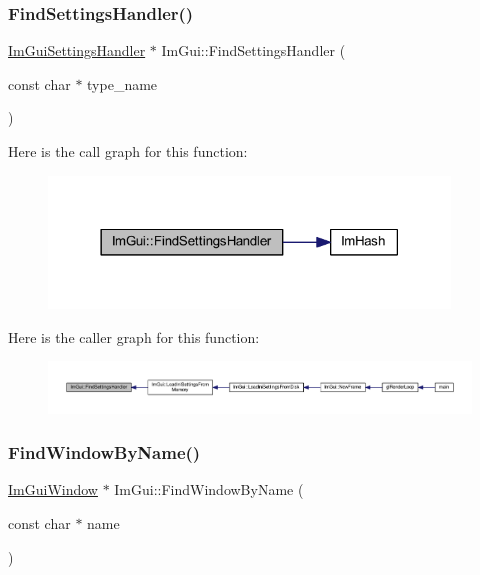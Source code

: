 \subsubsection{\texorpdfstring{Find\+Settings\+Handler()}{FindSettingsHandler()}}
{\footnotesize\ttfamily \mbox{\hyperlink{struct_im_gui_settings_handler}{Im\+Gui\+Settings\+Handler}} $\ast$ Im\+Gui\+::\+Find\+Settings\+Handler (\begin{DoxyParamCaption}\item[{const char $\ast$}]{type\+\_\+name }\end{DoxyParamCaption})}

Here is the call graph for this function\+:
\nopagebreak
\begin{figure}[H]
\begin{center}
\leavevmode
\includegraphics[width=302pt]{namespace_im_gui_ad9e15440c52f63aa96ef3b3938d566f8_cgraph}
\end{center}
\end{figure}
Here is the caller graph for this function\+:
\nopagebreak
\begin{figure}[H]
\begin{center}
\leavevmode
\includegraphics[width=350pt]{namespace_im_gui_ad9e15440c52f63aa96ef3b3938d566f8_icgraph}
\end{center}
\end{figure}
\mbox{\label{namespace_im_gui_abca25f22c02e73d5eb2e9c72c4557813}} 
\subsubsection{\texorpdfstring{Find\+Window\+By\+Name()}{FindWindowByName()}}
{\footnotesize\ttfamily \mbox{\hyperlink{struct_im_gui_window}{Im\+Gui\+Window}} $\ast$ Im\+Gui\+::\+Find\+Window\+By\+Name (\begin{DoxyParamCaption}\item[{const char $\ast$}]{name }\end{DoxyParamCaption})}


